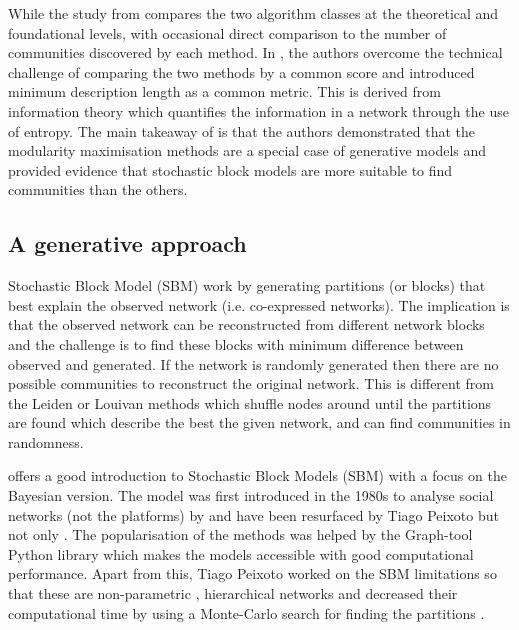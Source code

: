 While the study from \citet{Peixoto2021-jx} compares the two algorithm classes at the theoretical and foundational levels, with occasional direct comparison to the number of communities discovered by each method. In \citet{Peixoto2023-rt}, the authors overcome the technical challenge of comparing the two methods by a common score and introduced minimum description length as a common metric. This is derived from information theory which quantifies the information in a network through the use of entropy. The main takeaway of \citet{Peixoto2023-rt} is that the authors demonstrated that the modularity maximisation methods are a special case of generative models and provided evidence that stochastic block models are more suitable to find communities than the others.

\subsection{A generative approach} \label{s:lit:sbm}


Stochastic Block Model (SBM) work by generating partitions (or blocks) that best explain the observed network (i.e. co-expressed networks). The implication is that the observed network can be reconstructed from different network blocks and the challenge is to find these blocks with minimum difference between observed and generated. If the network is randomly generated then there are no possible communities to reconstruct the original network. This is different from the Leiden or Louivan methods which shuffle nodes around until the partitions are found which describe the best the given network, and can find communities in randomness. 

\citet{Peixoto2019-fg} offers a good introduction to Stochastic Block Models (SBM) with a focus on the Bayesian version. The model was first introduced in the 1980s to analyse social networks (not the platforms) by \citet{Holland1983-eu} and have been resurfaced by Tiago Peixoto \citep{Peixoto2014-ls, Peixoto2017-gc, Peixoto2018-ot} but not only \cite{Karrer2011-si}. The popularisation of the methods was helped by the Graph-tool Python library \citet{Peixoto2014-ls} which makes the models accessible with good computational performance. Apart from this, Tiago Peixoto worked on the SBM limitations so that these are non-parametric \citet{Peixoto2017-gc, Peixoto2018-ot}, hierarchical networks \citet{Peixoto2014-yb} and decreased their computational time by using a Monte-Carlo search for finding the partitions \cite{Peixoto2014-ss}.

